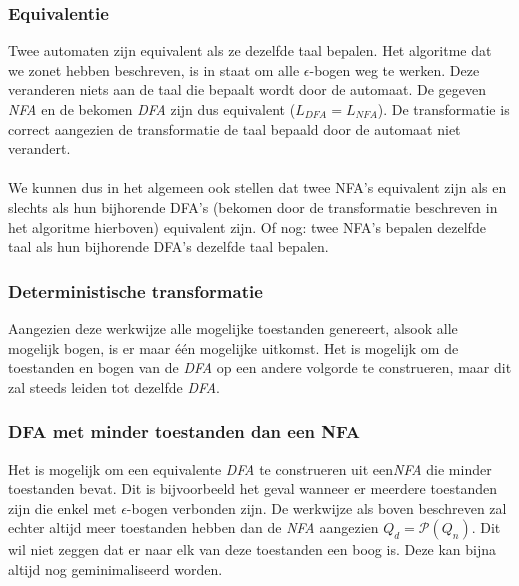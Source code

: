 \subsubsection*{Equivalentie}
Twee automaten zijn equivalent als ze dezelfde taal bepalen. Het algoritme dat we zonet hebben beschreven, is in staat om alle $\epsilon$-bogen weg te werken. Deze veranderen niets aan de taal die bepaalt wordt door de automaat. De gegeven \emph{NFA} en de bekomen \emph{DFA} zijn dus equivalent ($L_{DFA} = L_{NFA}$).  De transformatie is correct aangezien de transformatie de taal bepaald door de automaat niet verandert.
\\
\\
We kunnen dus in het algemeen ook stellen dat twee NFA's equivalent zijn als en slechts als hun bijhorende DFA's (bekomen door de transformatie beschreven in het algoritme hierboven) equivalent zijn. Of nog: twee NFA's bepalen dezelfde taal als hun bijhorende DFA's dezelfde taal bepalen.

\subsubsection*{Deterministische transformatie}
Aangezien deze werkwijze alle mogelijke toestanden genereert, alsook alle mogelijk bogen, is er maar \'e\'en mogelijke uitkomst. Het is mogelijk om de toestanden en bogen van de \emph{DFA} op een andere volgorde te construeren, maar dit zal steeds leiden tot dezelfde \emph{DFA}.

\subsubsection*{DFA met minder toestanden dan een NFA}

Het is mogelijk om een equivalente \emph{DFA} te construeren uit een\emph{NFA} die minder toestanden bevat. Dit is bijvoorbeeld het geval wanneer er meerdere toestanden zijn die enkel met $\epsilon$-bogen verbonden zijn. De werkwijze als boven beschreven zal echter altijd meer toestanden hebben dan de \emph{NFA} aangezien $Q_d = \mathcal{P}(Q_n)$. Dit wil niet zeggen dat er naar elk van deze toestanden een boog is. Deze kan bijna altijd nog geminimaliseerd worden.
